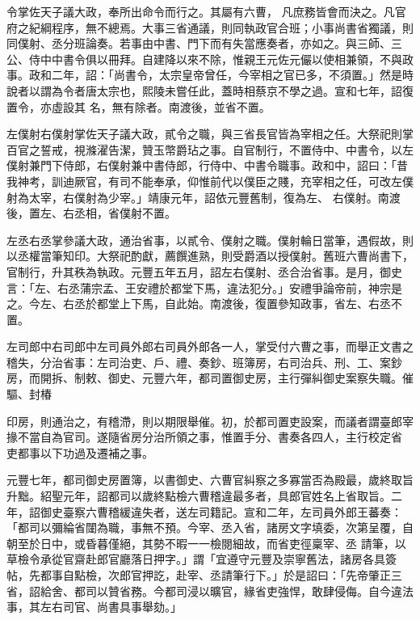 \begin{pinyinscope}
 令掌佐天子議大政，奉所出命令而行之。其屬有六曹，
 凡庶務皆會而決之。凡官府之紀綱程序，無不總焉。大事三省通議，則同執政官合班；小事尚書省獨議，則同僕射、丞分班論奏。若事由中書、門下而有失當應奏者，亦如之。與三師、三公、侍中中書令俱以冊拜。自建降以來不除，惟親王元佐元儼以使相兼領，不與政事。政和二年，詔：「尚書令，太宗皇帝曾任，今宰相之官已多，不須置。」然是時說者以謂為令者唐太宗也，熙陵未嘗任此，蓋時相蔡京不學之過。宣和七年，詔復置令，亦虛設其
 名，無有除者。南渡後，並省不置。



 左僕射右僕射掌佐天子議大政，貳令之職，與三省長官皆為宰相之任。大祭祀則掌百官之誓戒，視滌濯告潔，贊玉幣爵玷之事。自官制行，不置侍中、中書令，以左僕射兼門下侍郎，右僕射兼中書侍郎，行侍中、中書令職事。政和中，詔曰：「昔我神考，訓迪厥官，有司不能奉承，仰惟前代以僕臣之賤，充宰相之任，可改左僕射為太宰，右僕射為少宰。」靖康元年，詔依元豐舊制，復為左、
 右僕射。南渡後，置左、右丞相，省僕射不置。



 左丞右丞掌參議大政，通治省事，以貳令、僕射之職。僕射輪日當筆，遇假故，則以丞權當筆知印。大祭祀酌獻，薦饌進熟，則受爵酒以授僕射。舊班六曹尚書下，官制行，升其秩為執政。元豐五年五月，詔左右僕射、丞合治省事。是月，御史言：「左、右丞蒲宗孟、王安禮於都堂下馬，違法犯分。」安禮爭論帝前，神宗是之。今左、右丞於都堂上下馬，自此始。南渡後，復置參知政事，省左、右丞不
 置。



 左司郎中右司郎中左司員外郎右司員外郎各一人，掌受付六曹之事，而舉正文書之稽失，分治省事：左司治吏、戶、禮、奏鈔、班簿房，右司治兵、刑、工、案鈔房，而開拆、制敕、御史、元豐六年，都司置御史房，主行彈糾御史案察失職。催驅、封椿



 印房，則通治之，有稽滯，則以期限舉催。初，於都司置吏設案，而議者謂臺郎宰掾不當自為官司。遂隨省房分治所領之事，惟置手分、書奏各四人，主行校定省
 吏都事以下功過及遷補之事。



 元豐七年，都司御史房置簿，以書御史、六曹官糾察之多寡當否為殿最，歲終取旨升黜。紹聖元年，詔都司以歲終點檢六曹稽違最多者，具郎官姓名上省取旨。二年，詔御史臺察六曹稽緩違失者，送左司籍記。宣和二年，左司員外郎王蕃奏：「都司以彌綸省闥為職，事無不預。今宰、丞入省，諸房文字填委，次第呈覆，自朝至於日中，或昏暮僅絕，其勢不暇一一檢閱細故，而省吏徑稟宰、丞
 請筆，以草檢令承從官齋赴郎官廳落日押字。」謂「宜遵守元豐及崇寧舊法，諸房各具簽帖，先都事自點檢，次郎官押訖，赴宰、丞請筆行下。」於是詔曰：「先帝肇正三省，詔給舍、都司以贊省務。今都司浸以曠官，緣省吏強悍，敢肆侵侮。自今違法事，其左右司官、尚書具事舉劾。」




\end{pinyinscope}

